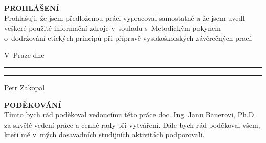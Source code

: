 \documentclass[a4paper, twoside, 11pt]{article}
\begin{document}
\newpage

\newpage




\null\newpage


\null\newpage

\setcounter{page}{5}%

\noindent \textcolor{ctublue}{{\Large{\textbf{\MakeTextUppercase{Prohlášení}}}}}\\
			Prohlašuji, že jsem předloženou práci vypracoval samostatně a že jsem uvedl veškeré použité informační zdroje v~souladu s~Metodickým pokynem o~dodržování etických principů při přípravě vysokoškolských závěrečných prací.\\
		\vspace{1.5cm}
		
	

	\noindent	V~Praze dne \rule{3.5cm}{0.4pt} \hspace{6.6cm}  \rule{4cm}{0.4pt}
	
	\hspace{12.65cm}Petr Zakopal


		\vspace{14cm}
		
	\noindent	\textcolor{ctublue}{{\Large{\textbf{\MakeTextUppercase{Poděkování}}}}}\\
	Tímto bych rád poděkoval vedoucímu této práce doc. Ing. Janu Bauerovi, Ph.D. za skvělé vedení práce a cenné rady při vytváření. Dále bych rád poděkoval všem, kteří mě v~mých dosavadních studijních aktivitách podporovali.
		


\end{document}
